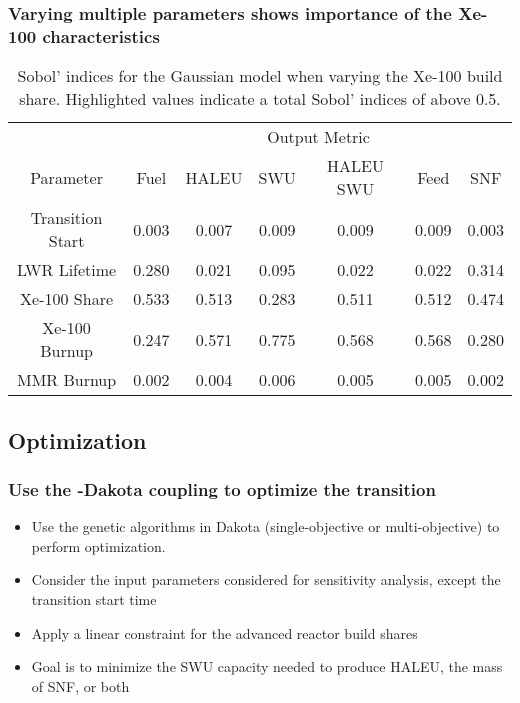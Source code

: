 \begin{frame}
    \frametitle{Varying multiple parameters shows importance of the 
    Xe-100 characteristics}
    \begin{table}
        \centering
        \caption{Sobol' indices for the Gaussian model when varying the 
        Xe-100 build share. Highlighted 
        values indicate a total Sobol' indices of above 0.5.}
        \label{tab:s7_sobol_xe100_gaussian}
        \begin{tabular}{c c c c c c c}
            \hline
            & \multicolumn{6}{c}{Output Metric} \\
            Parameter & Fuel & HALEU & SWU & HALEU SWU & Feed & SNF \\
            \hline
            Transition Start & 0.003 & 0.007 & 0.009 &
                               0.009 & 0.009 & 0.003\\
            LWR Lifetime & 0.280 & 0.021 & 0.095 &
                           0.022 & 0.022 & 0.314\\
            Xe-100 Share & \cellcolor{green!25}0.533 & \cellcolor{green!25}0.513 & 0.283 &
            \cellcolor{green!25}0.511 & \cellcolor{green!25}0.512 & 0.474\\
            Xe-100 Burnup & 0.247 & \cellcolor{green!25}0.571 & \cellcolor{green!25}0.775 & 
            \cellcolor{green!25}0.568 & \cellcolor{green!25}0.568 & 0.280\\
            MMR Burnup & 0.002 & 0.004 & 0.006 & 
                         0.005 & 0.005 & 0.002\\
            \hline        
        \end{tabular}
    \end{table}
\end{frame}

\subsection{Optimization}
\begin{frame}
    \frametitle{Use the \Cyclus-Dakota coupling to optimize the transition}
    \begin{itemize}
        \item Use the genetic algorithms in Dakota (single-objective or 
        multi-objective) to perform optimization.
        \item Consider the input parameters considered for sensitivity analysis, 
              except the transition start time
        \item Apply a linear constraint for the advanced reactor build shares
        \item Goal is to minimize the SWU capacity needed to 
             produce HALEU, the mass of SNF, or both
    \end{itemize}
\end{frame}

